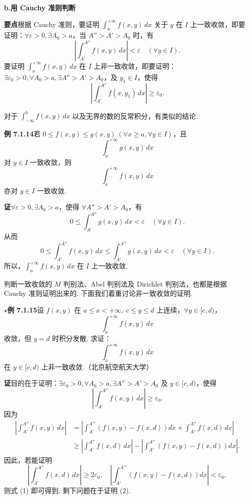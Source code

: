 \documentclass[UTF8,12pt,a4paper,fontset=fandol]{ctexart}
\begin{document}
\noindent\textbf{b.\quad 用 Cauchy 准则判断}

\noindent\textbf{要点}\quad 根据 Cauchy 准则，要证明 $\displaystyle\int_a^{+\infty}f(x,y)\,dx$ 关于 $y$ 在 $I$ 上一致收敛，即要证明：$\forall\varepsilon>0,\exists A_0>a$，当 $A''>A'>A_0$ 时，有
\[
\left|\int_{A'}^{A''}f(x,y)\,dx\right|<\varepsilon\quad(\forall y\in I).
\]
要证明 $\displaystyle\int_a^{+\infty}f(x,y)\,dx$ 在 $I$ 上非一致收敛，即要证明：$\exists\varepsilon_0>0,\forall A_0>a,\exists A''>A'>A_0$，及 $y_1\in I$，使得
\[
\left|\int_{A'}^{A''}f(x,y_1)\,dx\right|\ge\varepsilon_0.
\]

对于 $\displaystyle\int_{-\infty}^b f(x,y)\,dx$ 以及无界的数的反常积分，有类似的结论.

\noindent\textbf{例 7.1.14}\quad 若 $0\le f(x,y)\le g(x,y)\ (\forall x\ge a,\forall y\in I)$，且
\[
\int_a^{+\infty}g(x,y)\,dx
\]
对 $y\in I$ 一致收敛，则
\[
\int_a^{+\infty}f(x,y)\,dx
\]
亦对 $y\in I$ 一致收敛.

\noindent\textbf{证}\quad $\forall\varepsilon>0,\exists A_0>a$，使得 $\forall A''>A'>A_0$，有
\[
0\le\int_{A'}^{A''}g(x,y)\,dx<\varepsilon\quad(\forall y\in I).
\]
从而
\[
0\le\int_{A'}^{A''}f(x,y)\,dx\le\int_{A'}^{A''}g(x,y)\,dx<\varepsilon\quad(\forall y\in I).
\]
所以，$\displaystyle\int_a^{+\infty}f(x,y)\,dx$ 在 $I$ 上一致收敛.

判断一致收敛的 $M$ 判别法、Abel 判别法及 Dirichlet 判别法，也都是根据 Cauchy 准则证明出来的. 下面我们着重讨论非一致收敛的证明.

\noindent\textbf{$\star$例 7.1.15}\quad 设 $f(x,y)$ 在 $a\le x<+\infty,\ c\le y\le d$ 上连续，$\forall y\in[c,d)$，
\[
\int_a^{+\infty}f(x,y)\,dx
\]
收敛，但 $y=d$ 时积分发散. 求证：
\[
\int_a^{+\infty}f(x,y)\,dx
\]
在 $y\in[c,d)$ 上非一致收敛.（北京航空航天大学）

\noindent\textbf{证}\quad 目的在于证明：$\exists\varepsilon_0>0,\forall A_0>a,\exists A''>A'>A_0$ 及 $y\in[c,d)$，使得
\[
\left|\int_{A'}^{A''}f(x,y)\,dx\right|\ge\varepsilon_0.
\tag{1}
\]
因为
\[
\begin{aligned}
\left|\int_{A'}^{A''}f(x,y)\,dx\right|
&=\left|\int_{A'}^{A''}\left(f(x,y)-f(x,d)\right)dx+\int_{A'}^{A''}f(x,d)\,dx\right|\\
&\ge\left|\int_{A'}^{A''}f(x,d)\,dx\right|
-\left|\int_{A'}^{A''}\left(f(x,y)-f(x,d)\right)dx\right|.
\end{aligned}
\]
因此，若能证明
\[
\left|\int_{A'}^{A''}f(x,d)\,dx\right|\ge2\varepsilon_0,\quad
\left|\int_{A'}^{A''}\left(f(x,y)-f(x,d)\right)dx\right|<\varepsilon_0,
\tag{2}
\]
则式 (1) 即可得到. 剩下问题在于证明 (2).
\end{document}
